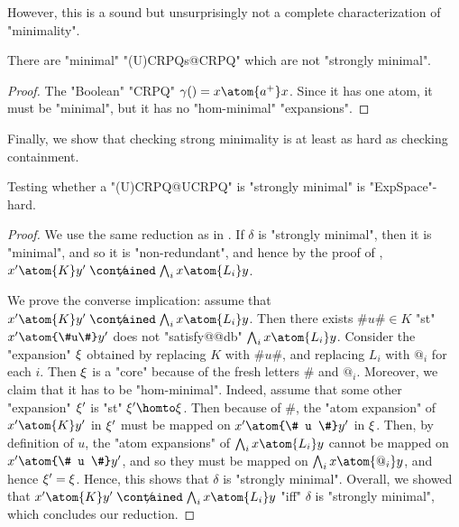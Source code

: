 However, this is a sound but unsurprisingly not a complete characterization of "minimality".

\begin{proposition}
	There are "minimal" "(U)CRPQs@CRPQ" which are not "strongly minimal". 
\end{proposition}

\begin{proof}
	The "Boolean" "CRPQ" $\gamma() = x \atom{a^+} x$. Since it has one atom, it must be "minimal", but it has no "hom-minimal" "expansions".
\end{proof}

Finally, we show that checking strong minimality is at least as hard as checking containment.

\begin{proposition}
	\AP\label{prop:lowerbound-strong-minimality}
	Testing whether a "(U)CRPQ@UCRPQ" is "strongly minimal" is "ExpSpace"-hard.
\end{proposition}

\begin{proof}
	We use the same reduction as in .
	If $\delta$ is "strongly minimal", then it is "minimal", and so it is
	"non-redundant", and hence
	by the proof of ,
	$x' \atom{K} y' \centernot{\contained} \bigwedge_i x \atom{L_i} y$.
	
	We prove the converse implication: assume that
		$x' \atom{K} y' \centernot{\contained} \bigwedge_i x \atom{L_i} y$.
	Then there exists $\#u\# \in K$ "st" $x' \atom{\#u\#} y'$
	does not "satisfy@@db" $\bigwedge_i x \atom{L_i} y$.
	Consider the "expansion" $\xi$ obtained by replacing $K$ with $\#u\#$, and replacing 
	$L_i$ with $@_i$ for each $i$.
	Then $\xi$ is a "core" because of the fresh letters $\#$ and $@_i$.
	Moreover, we claim that it has to be "hom-minimal".
	Indeed, assume that some other "expansion" $\xi'$ is "st" $\anexpansion'\homto \anexpansion$.
	Then because of $\#$, the "atom expansion" of $x' \atom{K} y'$ in $\xi'$ 
	must be mapped on $x' \atom{\# u \#} y'$ in $\xi$.
	Then, by definition of $u$, the "atom expansions" of $\bigwedge_i x \atom{L_i} y$
	cannot be mapped on $x' \atom{\# u \#} y'$, and so they must be mapped on
	$\bigwedge_i x \atom{@_i} y$, and hence $\xi' = \xi$.
	Hence, this shows that $\delta$ is "strongly minimal".
	Overall, we showed that $x' \atom{K} y' \centernot{\contained} \bigwedge_i x \atom{L_i} y$
	"iff" $\delta$ is "strongly minimal", which concludes our reduction.
\end{proof}